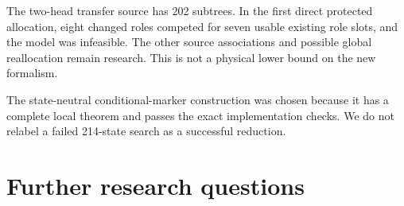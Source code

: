 \documentclass[11pt]{article}
\theoremstyle{definition}\newtheorem{definition}[theorem]{Definition}
\theoremstyle{remark}\newtheorem{remark}[theorem]{Remark}
\begin{document}
The two-head transfer source has 202 subtrees. In the first direct protected
allocation, eight changed roles competed for seven usable existing role
slots, and the model was infeasible. The other source associations and
possible global reallocation remain research. This is not a physical
lower bound on the new formalism.

The state-neutral conditional-marker construction was chosen because it
has a complete local theorem and passes the exact implementation checks.
We do not relabel a failed 214-state search as a successful reduction.

\section{Further research questions}\label{sec:questions}
\end{document}

